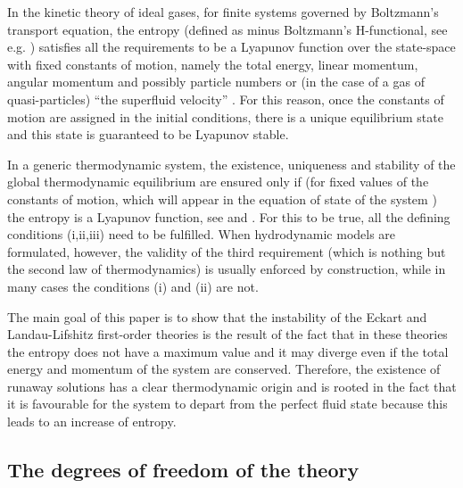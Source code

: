 \documentclass[a4paper, amsfonts, amssymb, amsmath, reprint, showkeys, nofootinbib, twoside]{revtex4-1}
\begin{document}
In the kinetic theory of ideal gases, for finite systems governed by Boltzmann's transport equation, the entropy (defined as minus Boltzmann's H-functional, see e.g. \cite{huang_book}) satisfies all the requirements to be a Lyapunov function \citep{cercignani_book} over the state-space with fixed constants of motion, namely the total energy, linear momentum, angular momentum and possibly particle numbers or (in the case of a gas of quasi-particles) ``the superfluid velocity'' \citep{huang_book,Termo}. 
For this reason, once the constants of motion are assigned in the initial conditions, there is a unique equilibrium state and this state is guaranteed to be Lyapunov stable. 

In a generic thermodynamic system, the existence, uniqueness and stability of the global thermodynamic equilibrium are ensured only if 
(for fixed values of the constants of motion, which will appear in the equation of state of the system \cite{GavassinoTermometri2020})
the entropy is a Lyapunov function,
see \cite{Prigogine1978} and \cite{Beretta1986}. 
For this to be true, all the defining conditions (i,ii,iii) need to be fulfilled. 
When hydrodynamic models are formulated, however, the validity of the third requirement (which is nothing but the second law of thermodynamics) is usually enforced by construction, while in many cases the conditions (i) and (ii) are not.  

The main goal of this paper is to show that the instability of the Eckart and Landau-Lifshitz first-order theories is the result of the fact that in these theories the entropy does not have a maximum value and it may diverge even if the total energy and momentum of the system are conserved. Therefore, the existence of runaway solutions has a clear thermodynamic origin and is rooted in the fact that it is favourable for the system to depart from the perfect fluid state because this leads to an increase of entropy.  

\subsection{The degrees of freedom of the theory}\label{genericoAed}
\end{document}
